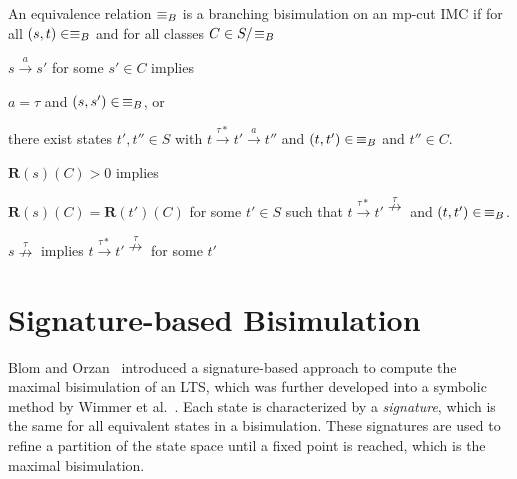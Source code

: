 \begin{definition}
\label{def:branchingimc}
An equivalence relation $\equiv_{B}$ is a branching bisimulation on an mp-cut IMC if for all $(s,t)\in\equiv_{B}$ and for all classes $C\in S/\!\equiv_{B}$
\begin{compactitem}
\item $s\overset{a}\rightarrow s'$ for some $s'\in C$ implies
\begin{compactitem}
\item $a=\tau$ and $(s,s')\in\,\equiv_{B}$, or
\item there exist states $t',t''\in S$ with $t \overset{\tau*}{\rightarrow} t'\overset{a}\rightarrow t''$ and $(t,t')\in\,\equiv_{B}$ and $t''\in C$.
\end{compactitem}
\item $\textbf{R}(s)(C)>0$ implies
\begin{compactitem}
\item $\textbf{R}(s)(C)=\textbf{R}(t')(C)$ for some $t'\in S$ such that $t \overset{\tau*}{\rightarrow} t'\!\stackrel{\tau}{\nrightarrow}$ and $(t,t')\in\,\equiv_{B}$.
\end{compactitem}
\item $s\!\stackrel{\tau}{\nrightarrow}$ implies $t\overset{\tau*}{\rightarrow} t'\!\stackrel{\tau}{\nrightarrow}$ for some $t'$
\end{compactitem}
\end{definition}






\section{Signature-based Bisimulation}
\label{sec:sigref}


Blom and Orzan~\cite{DBLP:journals/entcs/BlomO03} introduced a signature-based approach to compute the maximal bisimulation of an LTS,
which was further developed into a symbolic method by Wimmer et al.~\cite{DBLP:conf/atva/WimmerHHSB06}.
%
%
Each state is characterized by a \emph{signature}, which is the same for all equivalent states in a bisimulation.
These signatures are used to refine a partition of the state space until a fixed point is reached, which is the maximal bisimulation.

